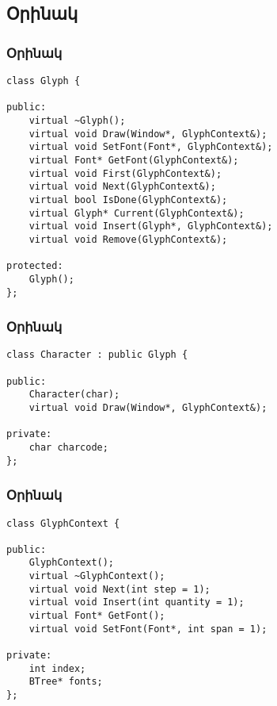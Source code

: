 \documentclass{beamer}
\begin{document}
\subsection{Օրինակ}
\begin{frame}[fragile]\frametitle{Օրինակ}
\begin{english}
\begin{verbatim}
class Glyph {

public:
    virtual ~Glyph();
    virtual void Draw(Window*, GlyphContext&);
    virtual void SetFont(Font*, GlyphContext&);
    virtual Font* GetFont(GlyphContext&);
    virtual void First(GlyphContext&);
    virtual void Next(GlyphContext&);
    virtual bool IsDone(GlyphContext&);
    virtual Glyph* Current(GlyphContext&);
    virtual void Insert(Glyph*, GlyphContext&);
    virtual void Remove(GlyphContext&);

protected:
    Glyph();
};
\end{verbatim}
\end{english}
\end{frame}

\begin{frame}[fragile]\frametitle{Օրինակ}
\begin{english}
\begin{verbatim}
class Character : public Glyph {

public:
    Character(char);
    virtual void Draw(Window*, GlyphContext&);

private:
    char charcode;
};
\end{verbatim}
\end{english}
\end{frame}

\begin{frame}[fragile]\frametitle{Օրինակ}
\begin{english}
\begin{verbatim}
class GlyphContext {

public:
    GlyphContext();
    virtual ~GlyphContext();
    virtual void Next(int step = 1);
    virtual void Insert(int quantity = 1);
    virtual Font* GetFont();
    virtual void SetFont(Font*, int span = 1);

private:
    int index;
    BTree* fonts;
};
\end{verbatim}
\end{english}
\end{frame}
\end{document}
